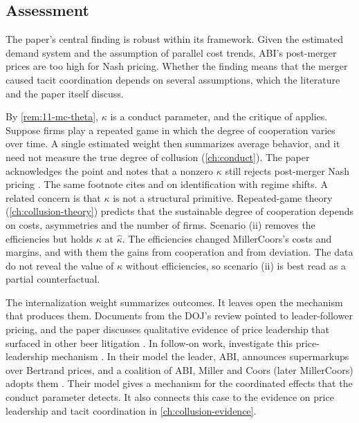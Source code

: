 \subsection{Assessment}\label{sec:11-mc-assessment}

The paper's central finding is robust within its framework. Given the estimated demand system and the assumption of
parallel cost trends, ABI's post-merger prices are too high for Nash pricing. Whether the finding means that the
merger caused tacit coordination depends on several assumptions, which the literature and the paper itself discuss.

By \cref{rem:11-mc-theta}, $\kappa$ is a conduct parameter, and the critique of \citet{Corts1999} applies. Suppose firms
play a repeated game in which the degree of cooperation varies over time. A single estimated weight then summarizes
average behavior, and it need not measure the true degree of collusion (\cref{ch:conduct}). The paper acknowledges the
point and notes that a nonzero $\kappa$ still rejects post-merger Nash pricing \citep[n.~12]{MillerWeinberg2017}. The
same footnote cites \citet{Bresnahan1989} and \citet{Porter1983} on identification with regime shifts. A related
concern is that $\kappa$ is not a structural primitive. Repeated-game theory (\cref{ch:collusion-theory}) predicts
that the sustainable degree of cooperation depends on costs, asymmetries and the number of firms. Scenario (ii)
removes the efficiencies but holds $\kappa$ at $\hat\kappa$. The efficiencies changed MillerCoors's costs and
margins, and with them the gains from cooperation and from deviation. The data do not reveal the value of $\kappa$
without efficiencies, so scenario (ii) is best read as a partial counterfactual.

The internalization weight summarizes outcomes. It leaves open the mechanism that produces them. Documents from the
DOJ's review pointed to leader-follower pricing, and the paper discusses qualitative evidence of price leadership that
surfaced in other beer litigation \citep[pp.~241--242]{AskerNocke2021}. In follow-on work, \citet{MillerSheuWeinberg2021}
investigate this price-leadership mechanism \citep[p.~242, n.~166]{AskerNocke2021}. In their model the leader, ABI, announces supermarkups over
Bertrand prices, and a coalition of ABI, Miller and Coors (later MillerCoors) adopts them
\citep[pp.~3124 and 3140]{MillerSheuWeinberg2021}. Their model gives a mechanism for the coordinated effects that the conduct parameter detects. It also connects this
case to the evidence on price leadership and tacit coordination in \cref{ch:collusion-evidence}.

